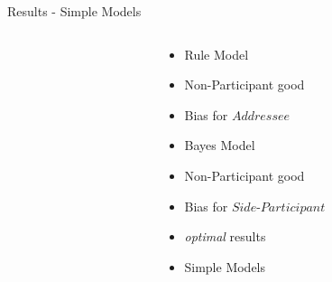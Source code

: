 \begin{frame}{Results - Simple Models}
  \begin{columns}[T] %
    \begin{column}{.7\textwidth}
    \end{column}%
    \begin{column}{.4\textwidth}
      \vspace{10pt}
      \footnotesize
      \begin{itemize}[label=-]
        \item<1->[] Rule Model 
        \item<2-> Non-Participant good
        \item<3-> Bias for \(Addressee\)
      \end{itemize}
      \vspace{5pt}
      \begin{itemize}[label=-]
        \item<4->[] Bayes Model
        \item<4-> Non-Participant good 
        \item<5-> Bias for \(Side\text{-}Participant\)
        \item<6-> \emph{optimal} results
      \end{itemize}
      \vspace{5pt}
      \begin{itemize}[label=-]
        \item<7->[\textcolor{mygreen}{\faCheckCircle}] Simple Models
      \end{itemize}
    \end{column}%
  \end{columns}
\end{frame}
